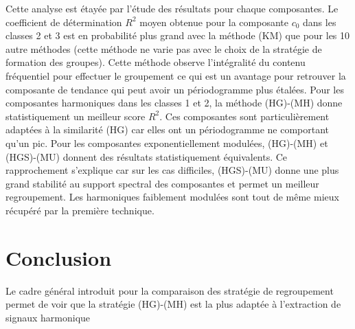 \documentclass{gretsi}
\begin{document}
Cette analyse est étayée par l'étude des résultats pour chaque composantes.
Le coefficient de détermination $R^2$ moyen obtenue pour la composante $c_0$ dans les classes 2 et 3 est en probabilité plus grand avec la méthode (KM) que pour les 10 autre méthodes (cette méthode ne varie pas avec le choix de la stratégie de formation des groupes). 
Cette méthode observe l'intégralité du contenu fréquentiel pour effectuer le groupement ce qui est un avantage pour retrouver la composante de tendance qui peut avoir un périodogramme plus étalées. 
Pour les composantes harmoniques dans les classes 1 et 2, la méthode (HG)-(MH) donne statistiquement un meilleur score $R^2$. 
Ces composantes sont particulièrement adaptées à la similarité (HG) car elles ont un périodogramme ne comportant qu'un pic.
Pour les composantes exponentiellement modulées, (HG)-(MH) et (HGS)-(MU) donnent des résultats statistiquement équivalents. Ce rapprochement s'explique car sur les cas difficiles, (HGS)-(MU) donne une plus grand stabilité au support spectral des composantes et permet un meilleur regroupement. Les harmoniques faiblement modulées sont tout de même mieux récupéré par la première technique.



\section{Conclusion}
\label{sec:ccl}
Le cadre général introduit pour la comparaison des stratégie de regroupement permet de voir que la stratégie (HG)-(MH) est la plus adaptée à l'extraction de signaux harmonique


 
\scriptsize
{}
\end{document}
